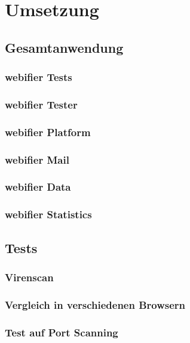 \chapter{Umsetzung}
\section{Gesamtanwendung}

\subsection{webifier Tests}

\subsection{webifier Tester}

\subsection{webifier Platform}

\subsection{webifier Mail}

\subsection{webifier Data}

\subsection{webifier Statistics}

\section{Tests}

\subsection{Virenscan}

\subsection{Vergleich in verschiedenen Browsern}

\subsection{Test auf Port Scanning}

